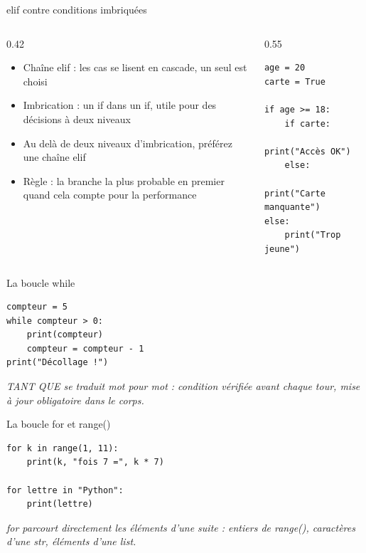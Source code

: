 \documentclass[aspectratio=169,11pt]{beamer}
\begin{document}
\begin{frame}[fragile]{elif contre conditions imbriquées}
\begin{columns}[t]
\begin{column}{0.42\textwidth}
\begin{itemize}
  \setlength{\itemsep}{1.5pt}\setlength{\parskip}{0pt}
  \item Chaîne elif : les cas se lisent en cascade, un seul est choisi
  \item Imbrication : un if dans un if, utile pour des décisions à deux niveaux
  \item Au delà de deux niveaux d'imbrication, préférez une chaîne elif
  \item Règle : la branche la plus probable en premier quand cela compte pour la performance
\end{itemize}
\end{column}
\hspace{0.02\textwidth}
\begin{column}{0.55\textwidth}
\begin{lstlisting}[style=pysmall]
age = 20
carte = True

if age >= 18:
    if carte:
        print("Accès OK")
    else:
        print("Carte manquante")
else:
    print("Trop jeune")
\end{lstlisting}
\end{column}
\end{columns}
\end{frame}

\begin{frame}[fragile]{La boucle while}

\begin{lstlisting}[style=py]
compteur = 5
while compteur > 0:
    print(compteur)
    compteur = compteur - 1
print("Décollage !")
\end{lstlisting}
\vspace{0.5pt}

{\small\color{PyGris}\itshape TANT QUE se traduit mot pour mot : condition vérifiée avant chaque tour, mise à jour obligatoire dans le corps.}

\end{frame}

\begin{frame}[fragile]{La boucle for et range()}

\begin{lstlisting}[style=py]
for k in range(1, 11):
    print(k, "fois 7 =", k * 7)

for lettre in "Python":
    print(lettre)
\end{lstlisting}
\vspace{0.5pt}

{\small\color{PyGris}\itshape for parcourt directement les éléments d'une suite : entiers de range(), caractères d'une str, éléments d'une list.}

\end{frame}
\end{document}

